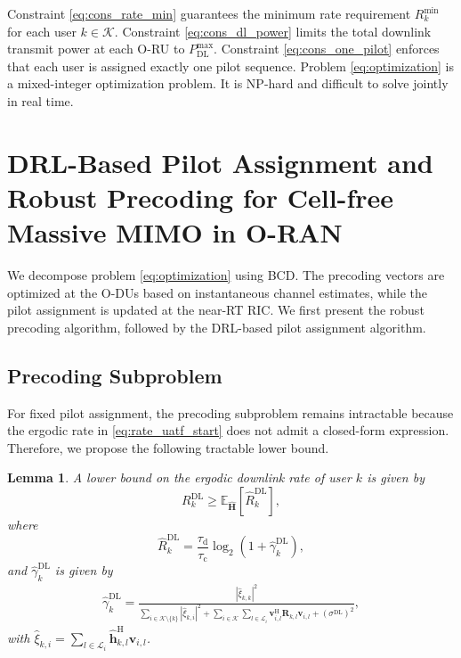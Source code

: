 \documentclass[10pt, conference]{IEEEtran}
\newtheorem{lemma}{Lemma}
\begin{document}
Constraint \eqref{eq:cons_rate_min} guarantees the minimum rate requirement $R_k^{\min}$ for each user $k\in\mathcal{K}$.
Constraint \eqref{eq:cons_dl_power} limits the total downlink transmit power at each O-RU to $P_\textrm{DL}^{\textrm{max}}$.
Constraint \eqref{eq:cons_one_pilot} enforces that each user is assigned exactly one pilot sequence.
Problem \eqref{eq:optimization} is a mixed-integer optimization problem. It is NP-hard and difficult to solve jointly in real time.

\section{DRL-Based Pilot Assignment and Robust Precoding for Cell-free Massive MIMO in O-RAN} \label{sec:algorithm}
We decompose problem \eqref{eq:optimization} using BCD. The precoding vectors are optimized at the O-DUs based on instantaneous channel estimates, while the pilot assignment is updated at the near-RT RIC. We first present the robust precoding algorithm, followed by the DRL-based pilot assignment algorithm.
\subsection{Precoding Subproblem}
For fixed pilot assignment, the precoding subproblem remains intractable because the ergodic rate in \eqref{eq:rate_uatf_start} does not admit a closed-form expression. Therefore, we propose the following tractable lower bound.
\begin{lemma}\label{lemma:ergodic_lower_bound}
A lower bound on the ergodic downlink rate of user $k$ is given by
\begin{equation}\label{eq:ergodic_bound}
    R_k^{\textrm{DL}} \geq \mathbb{E}_{\hat{\mathbf{H}}} \left[\hat{R}_k^{\textrm{DL}}\right],
\end{equation}
where
\begin{equation}\label{eq:conditional_UatF}
    \hat{R}_k^{\textrm{DL}} = \frac{\tau_{\textrm{d}}}{\tau_{\textrm{c}}} \log_2\left(1+\hat{\gamma}_k^{\textrm{DL}}\right),
\end{equation}
and $\hat{\gamma}_k^{\textrm{DL}}$ is given by
\begin{align}
\hat{\gamma}_k^{\textrm{DL}} =
\frac{\left|\hat{\xi}_{k,k}\right|^2}
{\sum\limits_{i\in\mathcal{K} \setminus \{k\}} \left|\hat{\xi}_{k,i}\right|^2
+ \sum\limits_{i \in \mathcal{K}} \sum\limits_{l\in \mathcal{L}_i}
\mathbf{v}_{i,l}^\mathrm{H} \mathbf{R}_{k,l} \mathbf{v}_{i,l}
+ \left(\sigma^{\mathrm{DL}}\right)^2},
\end{align}
with $\hat{\xi}_{k,i} = \sum_{l\in \mathcal{L}_i} \hat{\mathbf{h}}_{k,l}^\mathrm{H}\mathbf{v}_{i,l}$.
\end{lemma}
\end{document}

